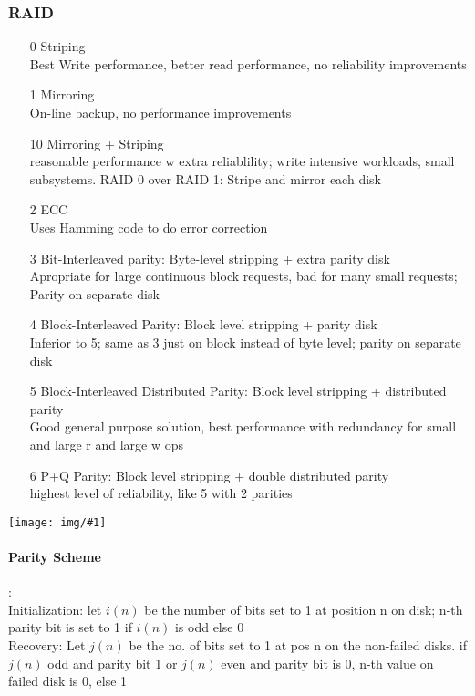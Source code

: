 \documentclass[a4paper]{article}
\newcommand{\img}[1]{\begin{center}
    \texttt{[image: img/\#1]}
\end{center} }
\begin{document}
\begin{twocolumn}
\subsubsection{RAID}
\begin{enumerate}
	\item[0] Striping \\
	Best Write performance, better read performance, no reliability improvements
	\item[1] Mirroring \\
	On-line backup, no performance improvements
	\item[10] Mirroring + Striping \\
	reasonable performance w extra reliablility; write intensive workloads, small subsystems. RAID 0 over RAID 1: Stripe and mirror each disk
	\item[2] ECC \\
	Uses Hamming code to do error correction
	\item[3] Bit-Interleaved parity: Byte-level stripping + extra parity disk \\
	Apropriate for large continuous block requests, bad for many small requests; Parity on separate disk
	\item[4] Block-Interleaved Parity: Block level stripping + parity disk \\
	Inferior to 5; same as 3 just on block instead of byte level; parity on separate disk
	\item[5] Block-Interleaved Distributed Parity: Block level stripping + distributed parity \\
	Good general purpose solution, best performance with redundancy for small and large r and large w ops
	\item[6] P+Q Parity: Block level stripping + double distributed parity \\
	highest level of reliability, like 5 with 2 parities
\end{enumerate}
\img{raid_overview.png}
\paragraph{Parity Scheme}: \\
Initialization: let $i(n)$ be the number of bits set to 1 at position n on disk; n-th parity bit is set to 1 if $i(n)$ is odd else 0 \\
Recovery: Let $j(n)$ be the no. of bits set to 1 at pos n on the non-failed disks. if $j(n)$ odd and parity bit 1 or $j(n)$ even and parity bit is 0, n-th value on failed disk is 0, else 1


\end{twocolumn}
\end{document}
